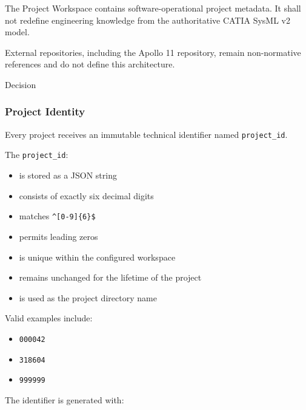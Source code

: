 The Project Workspace contains software-operational project metadata. It shall not redefine engineering knowledge from the authoritative CATIA SysML v2 model.

External repositories, including the Apollo 11 repository, remain non-normative references and do not define this architecture.

Decision

\hypertarget{project-identity}{%
\subsubsection{Project Identity}\label{project-identity}}

Every project receives an immutable technical identifier named \texttt{project\_id}.

The \texttt{project\_id}:

\begin{itemize}
\tightlist
\item
  is stored as a JSON string
\item
  consists of exactly six decimal digits
\item
  matches \texttt{\^{}{[}0-9{]}\{6\}\$}
\item
  permits leading zeros
\item
  is unique within the configured workspace
\item
  remains unchanged for the lifetime of the project
\item
  is used as the project directory name
\end{itemize}

Valid examples include:

\begin{itemize}
\tightlist
\item
  \texttt{000042}
\item
  \texttt{318604}
\item
  \texttt{999999}
\end{itemize}

The identifier is generated with:

\begin{Shaded}
\begin{Highlighting}[]
\SpecialCharTok{\{}\NormalTok{)}
\end{Highlighting}
\end{Shaded}

